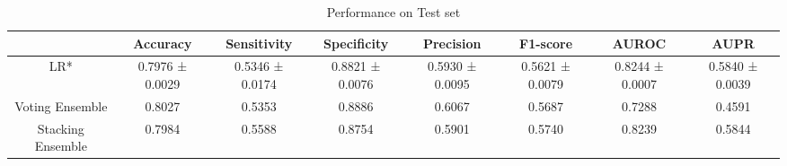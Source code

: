\begin{table}[h!]
\centering
\caption{Performance on Test set}
\begin{adjustbox}{width=\textwidth}
\begin{tabular}{|c|c|c|c|c|c|c|c|}
\hline
  & Accuracy & Sensitivity & Specificity & Precision & F1-score & AUROC & AUPR \\
\hline
LR* & 0.7976 ± 0.0029 & 0.5346 ± 0.0174 & 0.8821 ± 0.0076 & 0.5930 ± 0.0095 & 0.5621 ± 0.0079 & 0.8244 ± 0.0007 & 0.5840 ± 0.0039 \\
\hline
Voting Ensemble & 0.8027 & 0.5353 & 0.8886 & 0.6067 & 0.5687 & 0.7288 & 0.4591 \\
\hline
Stacking Ensemble & 0.7984 & 0.5588 & 0.8754 & 0.5901 & 0.5740 & 0.8239 & 0.5844 \\
\hline
\end{tabular}
\end{adjustbox}
\end{table}
    